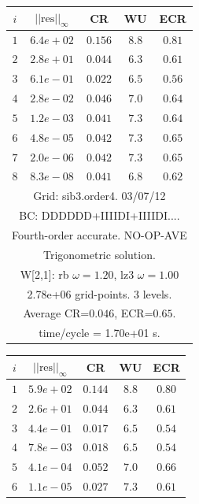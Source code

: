 \begin{table}[hbt]
\begin{center}
{\tablefontsize
\begin{tabular}{|c|c|c|c|c|} \hline 
 $i$   & $\vert\vert\mbox{res}\vert\vert_\infty$  &  CR     &  WU    & ECR  \\   \hline 
 $ 1$  & $ 6.4e+02$ & $0.156$ & $ 8.8$ & $0.81$ \\ 
 $ 2$  & $ 2.8e+01$ & $0.044$ & $ 6.3$ & $0.61$ \\ 
 $ 3$  & $ 6.1e-01$ & $0.022$ & $ 6.5$ & $0.56$ \\ 
 $ 4$  & $ 2.8e-02$ & $0.046$ & $ 7.0$ & $0.64$ \\ 
 $ 5$  & $ 1.2e-03$ & $0.041$ & $ 7.3$ & $0.64$ \\ 
 $ 6$  & $ 4.8e-05$ & $0.042$ & $ 7.3$ & $0.65$ \\ 
 $ 7$  & $ 2.0e-06$ & $0.042$ & $ 7.3$ & $0.65$ \\ 
 $ 8$  & $ 8.3e-08$ & $0.041$ & $ 6.8$ & $0.62$ \\ 
\hline 
\multicolumn{5}{|c|}{Grid: sib3.order4. 03/07/12}  \\
\multicolumn{5}{|c|}{BC: DDDDDD+IIIIDI+IIIIDI....}  \\
\multicolumn{5}{|c|}{Fourth-order accurate. NO-OP-AVE}  \\
\multicolumn{5}{|c|}{Trigonometric solution.}  \\
\multicolumn{5}{|c|}{W[2,1]: rb $\omega=1.20$, lz3 $\omega=1.00$}  \\
\multicolumn{5}{|c|}{2.78e+06 grid-points. 3 levels.}  \\
\multicolumn{5}{|c|}{Average CR=$0.046$, ECR=$0.65$.}  \\
\multicolumn{5}{|c|}{time/cycle = 1.70e+01 s.}  \\
\hline 
\end{tabular}
\begin{tabular}{|c|c|c|c|c|} \hline 
 $i$   & $\vert\vert\mbox{res}\vert\vert_\infty$  &  CR     &  WU    & ECR  \\   \hline 
 $ 1$  & $ 5.9e+02$ & $0.144$ & $ 8.8$ & $0.80$ \\ 
 $ 2$  & $ 2.6e+01$ & $0.044$ & $ 6.3$ & $0.61$ \\ 
 $ 3$  & $ 4.4e-01$ & $0.017$ & $ 6.5$ & $0.54$ \\ 
 $ 4$  & $ 7.8e-03$ & $0.018$ & $ 6.5$ & $0.54$ \\ 
 $ 5$  & $ 4.1e-04$ & $0.052$ & $ 7.0$ & $0.66$ \\ 
 $ 6$  & $ 1.1e-05$ & $0.027$ & $ 7.3$ & $0.61$ \\ 

\end{tabular}}
\end{center}
\end{table}
